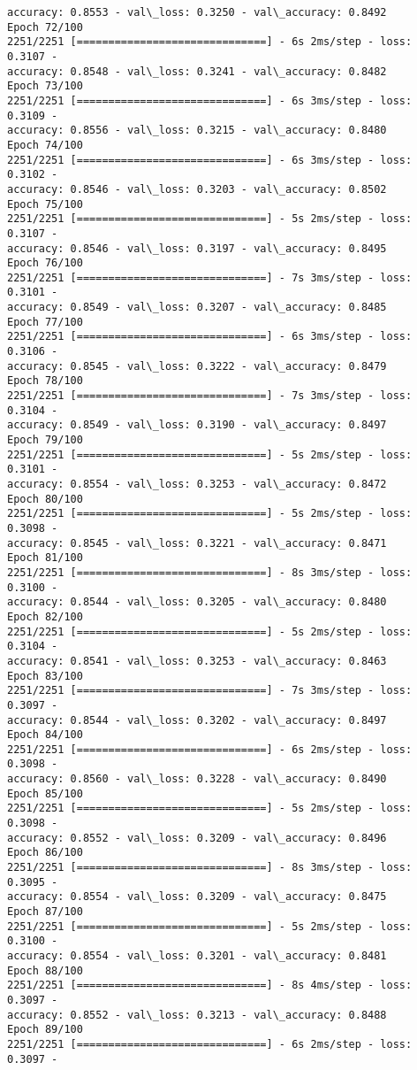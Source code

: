 \documentclass[11pt]{article}
\begin{document}
\begin{Verbatim}[commandchars=\\\{\}]
accuracy: 0.8553 - val\_loss: 0.3250 - val\_accuracy: 0.8492
Epoch 72/100
2251/2251 [==============================] - 6s 2ms/step - loss: 0.3107 -
accuracy: 0.8548 - val\_loss: 0.3241 - val\_accuracy: 0.8482
Epoch 73/100
2251/2251 [==============================] - 6s 3ms/step - loss: 0.3109 -
accuracy: 0.8556 - val\_loss: 0.3215 - val\_accuracy: 0.8480
Epoch 74/100
2251/2251 [==============================] - 6s 3ms/step - loss: 0.3102 -
accuracy: 0.8546 - val\_loss: 0.3203 - val\_accuracy: 0.8502
Epoch 75/100
2251/2251 [==============================] - 5s 2ms/step - loss: 0.3107 -
accuracy: 0.8546 - val\_loss: 0.3197 - val\_accuracy: 0.8495
Epoch 76/100
2251/2251 [==============================] - 7s 3ms/step - loss: 0.3101 -
accuracy: 0.8549 - val\_loss: 0.3207 - val\_accuracy: 0.8485
Epoch 77/100
2251/2251 [==============================] - 6s 3ms/step - loss: 0.3106 -
accuracy: 0.8545 - val\_loss: 0.3222 - val\_accuracy: 0.8479
Epoch 78/100
2251/2251 [==============================] - 7s 3ms/step - loss: 0.3104 -
accuracy: 0.8549 - val\_loss: 0.3190 - val\_accuracy: 0.8497
Epoch 79/100
2251/2251 [==============================] - 5s 2ms/step - loss: 0.3101 -
accuracy: 0.8554 - val\_loss: 0.3253 - val\_accuracy: 0.8472
Epoch 80/100
2251/2251 [==============================] - 5s 2ms/step - loss: 0.3098 -
accuracy: 0.8545 - val\_loss: 0.3221 - val\_accuracy: 0.8471
Epoch 81/100
2251/2251 [==============================] - 8s 3ms/step - loss: 0.3100 -
accuracy: 0.8544 - val\_loss: 0.3205 - val\_accuracy: 0.8480
Epoch 82/100
2251/2251 [==============================] - 5s 2ms/step - loss: 0.3104 -
accuracy: 0.8541 - val\_loss: 0.3253 - val\_accuracy: 0.8463
Epoch 83/100
2251/2251 [==============================] - 7s 3ms/step - loss: 0.3097 -
accuracy: 0.8544 - val\_loss: 0.3202 - val\_accuracy: 0.8497
Epoch 84/100
2251/2251 [==============================] - 6s 2ms/step - loss: 0.3098 -
accuracy: 0.8560 - val\_loss: 0.3228 - val\_accuracy: 0.8490
Epoch 85/100
2251/2251 [==============================] - 5s 2ms/step - loss: 0.3098 -
accuracy: 0.8552 - val\_loss: 0.3209 - val\_accuracy: 0.8496
Epoch 86/100
2251/2251 [==============================] - 8s 3ms/step - loss: 0.3095 -
accuracy: 0.8554 - val\_loss: 0.3209 - val\_accuracy: 0.8475
Epoch 87/100
2251/2251 [==============================] - 5s 2ms/step - loss: 0.3100 -
accuracy: 0.8554 - val\_loss: 0.3201 - val\_accuracy: 0.8481
Epoch 88/100
2251/2251 [==============================] - 8s 4ms/step - loss: 0.3097 -
accuracy: 0.8552 - val\_loss: 0.3213 - val\_accuracy: 0.8488
Epoch 89/100
2251/2251 [==============================] - 6s 2ms/step - loss: 0.3097 -

\end{Verbatim}
\end{document}

